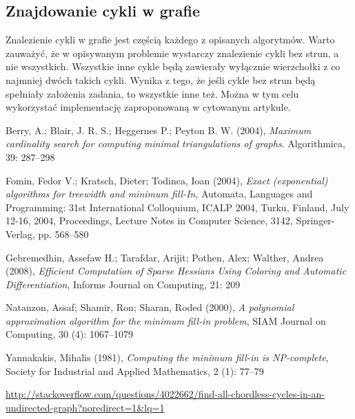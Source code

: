 \documentclass{article}
\begin{document}
\subsection{Znajdowanie cykli w grafie}
Znalezienie cykli w grafie jest częścią każdego z opisanych algorytmów. 
Warto zauważyć, że w opisywanym problemie wystarczy znalezienie cykli bez strun, a nie wszystkich. Wszystkie inne cykle będą zawierały wyłącznie wierzchołki z co najmniej dwóch takich cykli. 
Wynika z tego, że jeśli cykle bez strun będą spełniały założenia zadania, to wszystkie inne też.
Można w tym celu wykorzystać implementację zaproponowaną w cytowanym artykule\cite{Cycle}.



\begin{thebibliography}{20}
Berry, A.; Blair, J. R. S.; Heggernes P.; Peyton B. W. (2004), \textit{Maximum cardinality search for computing minimal triangulations of graphs}.
Algorithmica, 39: 287–298

Fomin, Fedor V.; Kratsch, Dieter; Todinca, Ioan (2004), \textit{Exact (exponential) algorithms for treewidth and minimum fill-In}, Automata, Languages and Programming: 31st International Colloquium, ICALP 2004, Turku, Finland, July 12-16, 2004, Proceedings, Lecture Notes in Computer Science, 3142, Springer-Verlag, pp. 568–580

Gebremedhin, Assefaw H.; Tarafdar, Arijit; Pothen, Alex; Walther, Andrea (2008), \textit{Efficient Computation of Sparse Hessians Using Coloring and Automatic Differentiation}, Informs Journal on Computing, 21: 209

Natanzon, Assaf; Shamir, Ron; Sharan, Roded (2000), \textit{A polynomial approximation algorithm for the minimum fill-in problem}, SIAM Journal on Computing, 30 (4): 1067–1079

Yannakakis, Mihalis (1981), \textit{Computing the minimum fill-in is NP-complete}, Society for Industrial and Applied Mathematics, 2 (1): 77–79

\url{http://stackoverflow.com/questions/4022662/find-all-chordless-cycles-in-an-undirected-graph?noredirect=1\&lq=1}

\end{thebibliography}
\end{document}

